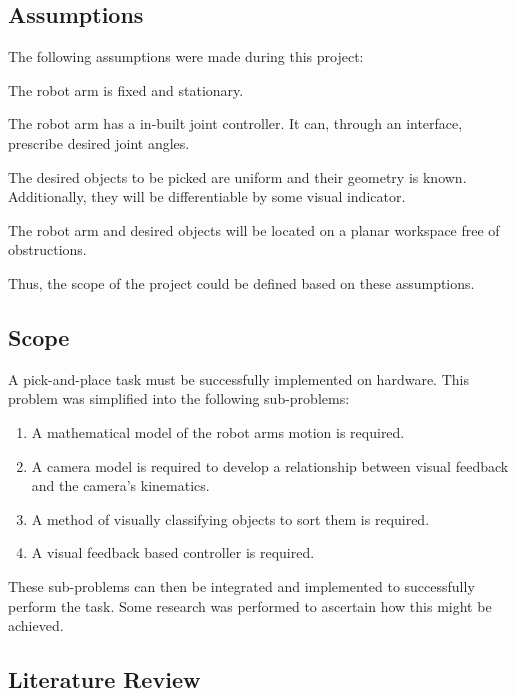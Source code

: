 \documentclass{UoNMCHA}
\numberwithin{equation}{section}
\begin{document}
	\subsection{Assumptions} \label{Assumptions}
    
    The following assumptions were made during this project:\\
    \begin{description}[style=multiline,leftmargin=3cm]
    	\item[\textbf{Assumption A}:] The robot arm is fixed and stationary.
    	\item[\textbf{Assumption B}:] The robot arm has a in-built joint controller. It can, through an interface, prescribe desired joint angles.
    	\item[\textbf{Assumption C}:] The desired objects to be picked are uniform and their geometry is known. Additionally, they will be differentiable by some visual indicator.
    	\item[\textbf{Assumption D}:] The robot arm and desired objects will be located on a planar workspace free of obstructions.  
    \end{description}

	Thus, the scope of the project could be defined based on these assumptions.
	
	\subsection{Scope}\label{Scope}
	
	A pick-and-place task must be successfully implemented on hardware. This problem was simplified into the following sub-problems:
	\begin{enumerate}
		\item A mathematical model of the robot arms motion is required. 
		\item A camera model is required to develop a relationship between visual feedback and the camera's kinematics.
		\item A method of visually classifying objects to sort them is required.
		\item A visual feedback based controller is required.
	\end{enumerate}
	
	These sub-problems can then be integrated and implemented to successfully perform the task. Some research was performed to ascertain how this might be achieved. 
		   	
    \subsection{Literature Review}\label{Literature Review}
    
\end{document}
